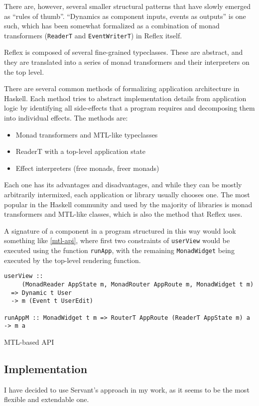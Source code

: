 \documentclass[english,odsaz]{fitthesis}
\begin{document}
There are, however, several smaller structural patterns that have slowly emerged
as ``rules of thumb''. ``Dynamics as component inputs, events as outputs'' is one
such, which has been somewhat formalized as a combination of monad transformers
(\texttt{ReaderT} and \texttt{EventWriterT}) in Reflex itself.

Reflex is composed of several fine-grained typeclasses. These are abstract, and
they are translated into a series of monad transformers and their interpreters
on the top level.

There are several common methods of formalizing application architecture in
Haskell. Each method tries to abstract implementation details from application
logic by identifying all side-effects that a program requires and decomposing
them into individual effects. The methods are:

\begin{itemize}
\item Monad transformers and MTL-like typeclasses
\item ReaderT with a top-level application state
\item Effect interpreters (free monads, freer monads)
\end{itemize}

Each one has its advantages and disadvantages, and while they can be mostly
arbitrarily intermixed, each application or library usually chooses one. The
most popular in the Haskell community and used by the majority of libraries is
monad transformers and MTL-like classes, which is also the method that Reflex
uses.

A signature of a component in a program structured in this way would look
something like \ref{mtl-api}, where first two constraints of \texttt{userView} would be
executed using the function \texttt{runApp}, with the remaining \texttt{MonadWidget} being
executed by the top-level rendering function.

\begin{listing}[htbp]
\begin{verbatim}
userView ::
     (MonadReader AppState m, MonadRouter AppRoute m, MonadWidget t m)
  => Dynamic t User
  -> m (Event t UserEdit)

runAppM :: MonadWidget t m => RouterT AppRoute (ReaderT AppState m) a -> m a
\end{verbatim}
\caption{MTL-based API \label{mtl-api}}
\end{listing}

\subsection{Implementation}
\label{sec:org15c43f0}
I have decided to use Servant's approach in my work, as it seems to be the most
flexible and extendable one.
\end{document}

